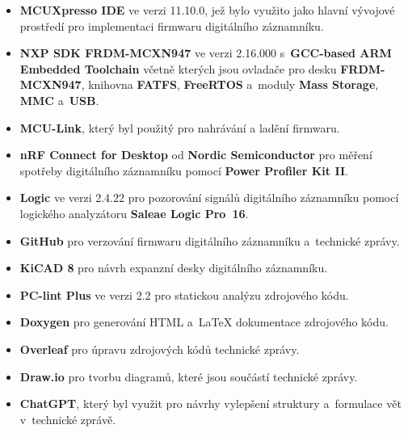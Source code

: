\begin{itemize}
    \item \textbf{MCUXpresso IDE} ve verzi 11.10.0, jež bylo využito jako hlavní vývojové prostředí pro implementaci firmwaru digitálního záznamníku.
    \item \textbf{NXP SDK FRDM-MCXN947} ve verzi 2.16.000 s~\textbf{GCC-based ARM Embedded Toolchain} včetně kterých jsou ovladače pro desku \textbf{FRDM-MCXN947}, knihovna \textbf{FATFS}, \textbf{FreeRTOS} a~moduly \textbf{Mass Storage}, \textbf{MMC} a~\textbf{USB}.
    \item \textbf{MCU-Link}, který byl použitý pro nahrávání a ladění firmwaru.
    \item \textbf{nRF Connect for Desktop} od \textbf{Nordic Semiconductor} pro měření spotřeby digitálního záznamníku pomocí \textbf{Power Profiler Kit II}.
    \item \textbf{Logic} ve verzi 2.4.22 pro pozorování signálů digitálního záznamníku pomocí logického analyzátoru \textbf{Saleae Logic Pro~16}.
    \item \textbf{GitHub} pro verzování firmwaru digitálního záznamníku a~technické zprávy.
    \item \textbf{KiCAD 8} pro návrh expanzní desky digitálního záznamníku.
    \item \textbf{PC-lint Plus} ve verzi 2.2 pro statickou analýzu zdrojového kódu. 
    \item \textbf{Doxygen} pro generování HTML a~LaTeX dokumentace zdrojového kódu.
    \item \textbf{Overleaf} pro úpravu zdrojových kódů technické zprávy.
    \item \textbf{Draw.io} pro tvorbu diagramů, které jsou součástí technické zprávy.
    \item \textbf{ChatGPT}, který byl využit pro návrhy vylepšení struktury a~formulace vět v~technické zprávě.
\end{itemize}

%
